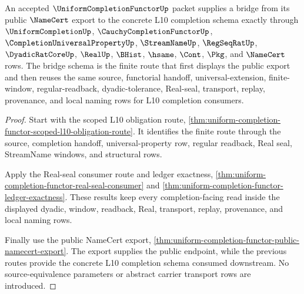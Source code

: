 \begin{theorem}
\label{thm:uniformcompletionfunctor-bridge-schema}
An accepted $\UniformCompletionFunctorUp$ packet supplies a bridge from its public $\NameCert$ export to the concrete L10 completion schema exactly through $\UniformCompletionUp$, $\CauchyCompletionFunctorUp$, $\CompletionUniversalPropertyUp$, $\StreamNameUp$, $\RegSeqRatUp$, $\DyadicRatCoreUp$, $\RealUp$, $\BHist$, $\hsame$, $\Cont$, $\Pkg$, and $\NameCert$ rows. The bridge schema is the finite route that first displays the public export and then reuses the same source, functorial handoff, universal-extension, finite-window, regular-readback, dyadic-tolerance, Real-seal, transport, replay, provenance, and local naming rows for L10 completion consumers.
\end{theorem}
\begin{proof}
Start with the scoped L10 obligation route, \autoref{thm:uniform-completion-functor-scoped-l10-obligation-route}. It identifies the finite route through the source, completion handoff, universal-property row, regular readback, Real seal, StreamName windows, and structural rows.

Apply the Real-seal consumer route and ledger exactness, \autoref{thm:uniform-completion-functor-real-seal-consumer} and \autoref{thm:uniform-completion-functor-ledger-exactness}. These results keep every completion-facing read inside the displayed dyadic, window, readback, Real, transport, replay, provenance, and local naming rows.

Finally use the public NameCert export, \autoref{thm:uniform-completion-functor-public-namecert-export}. The export supplies the public endpoint, while the previous routes provide the concrete L10 completion schema consumed downstream. No source-equivalence parameters or abstract carrier transport rows are introduced.
\end{proof}

